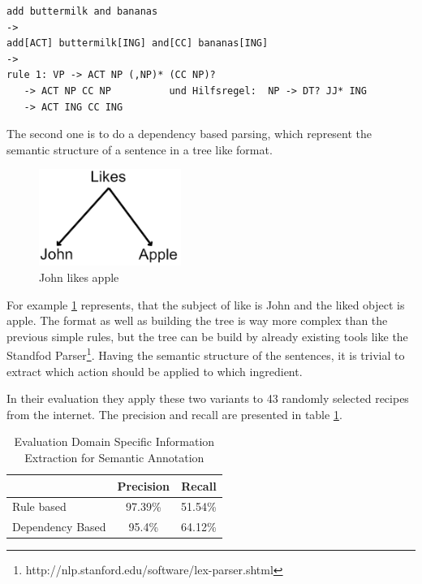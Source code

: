 \documentclass[12pt, twoside]{report}
\begin{document}
\begin{lstlisting}[frame=single, basicstyle=\footnotesize\ttfamily,caption={Rule based example}, label=lst:ruleBased]
add buttermilk and bananas
->
add[ACT] buttermilk[ING] and[CC] bananas[ING]
->
rule 1: VP -> ACT NP (,NP)* (CC NP)?
   -> ACT NP CC NP			und Hilfsregel:  NP -> DT? JJ* ING
   -> ACT ING CC ING

\end{lstlisting}

The second one is to do a dependency based parsing, which represent the semantic structure of a sentence in a tree like format.

\begin{figure}[h]
	\centering
	\includegraphics[]{Images/JohnLikesApple}
	\caption{John likes apple \parencite{GrammaBased}}
	\label{fig:johnLikesApple}
\end{figure}

For example \cref{fig:johnLikesApple} represents, that the subject of like is John and the liked object is apple.
The format as well as building the tree is way more complex than the previous simple rules, but the tree can be build by already existing tools like the Standfod Parser\footnote{http://nlp.stanford.edu/software/lex-parser.shtml}. Having the semantic structure of the sentences, it is trivial to extract which action should be applied to which ingredient.

In their evaluation they apply these two variants to 43 randomly selected recipes from the internet. The precision and recall are presented in table \ref{tab:masterEval}.

\begin{table}[H]
	\centering
	\begin{tabular}{ l | c | r } 
		& Precision & Recall \\
		\hline
		Rule based & 97.39\% & 51.54\% \\
		Dependency Based & 95.4\% & 64.12\% \\
	\end{tabular}
	\caption{Evaluation Domain Specific Information Extraction for Semantic Annotation}
	\label{tab:masterEval}
\end{table}
\end{document}
